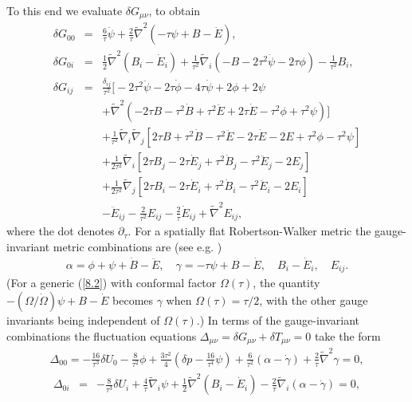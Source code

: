 To this end we evaluate $\delta G_{\mu\nu}$, to obtain 
%
\begin{eqnarray}
\delta G_{00}&=&\frac{6}{\tau}\dot{\psi}+\frac{2}{\tau}\tilde{\nabla}^2(-\tau \psi +B-\dot{E}),
\nonumber\\
\delta G_{0i}&=&\frac{1}{2}\tilde{\nabla}^2(B_i-\dot{E}_i)+\frac{1}{\tau^2}\tilde{\nabla}_i(-B-2\tau^2\dot{\psi}-2\tau \phi)-\frac{1}{\tau^2}B_i,
\nonumber\\
\delta G_{ij}&=&\frac{\delta_{ij}}{\tau^2}\bigg[-2\tau^2\ddot{\psi}-2\tau\dot{\phi}-4\tau\dot{\psi}+2\phi+2\psi
\nonumber\\
&&+\tilde{\nabla}^2\left(-2\tau B-\tau^2\dot{B}+\tau^2\ddot{E}+2\tau\dot{E}-\tau^2\phi+\tau^2\psi\right)\bigg]
\nonumber\\
&&+\frac{1}{\tau^2}\tilde{\nabla}_i\tilde{\nabla}_j\left[2\tau B +\tau^2\dot{B}-\tau^2\ddot{E}-2\tau\dot{E}-2E+\tau^2\phi-\tau^2\psi\right]
\nonumber\\
&&+\frac{1}{2\tau^2}\tilde{\nabla}_i\left[2\tau B_j-2\tau\dot{E}_j+\tau^2\dot{B}_j-\tau^2\ddot{E}_j-2E_j\right]
\nonumber\\
&&+\frac{1}{2\tau^2}\tilde{\nabla}_j\left[2\tau B_i-2\tau\dot{E}_i+\tau^2\dot{B}_i-\tau^2\ddot{E}_i-2E_i\right]
\nonumber\\
&&-\ddot{E}_{ij}-\frac{2}{\tau^2}E_{ij}-\frac{2}{\tau}\dot{E}_{ij}+\tilde{\nabla}^2E_{ij},
\label{8.6}
\end{eqnarray}
%
where the dot denotes $\partial_\tau$.
For a spatially flat Robertson-Walker  metric the gauge-invariant metric combinations are (see e.g. \cite{amarasinghe_2019})
%
\begin{eqnarray}
\alpha=\phi+\psi+\dot{B}-\ddot{E} ,\quad \gamma=-\tau\psi+B-\dot{E}, \quad B_i-\dot{E}_i,\quad E_{ij}.
\label{8.7}
\end{eqnarray}
%
(For a generic (\ref{8.2}) with conformal factor $\Omega(\tau)$, the quantity $-(\Omega/\dot{\Omega})\psi+B-\dot{E}$ becomes $\gamma$ when $\Omega(\tau)=\tau/2$, with the other gauge invariants being independent of $\Omega(\tau)$.)
In terms of the gauge-invariant combinations the fluctuation equations $\Delta_{\mu\nu}=\delta G_{\mu\nu}+\delta T_{\mu\nu}=0$ take the form
%
\begin{eqnarray}
\Delta_{00}=-\frac{16}{\tau^3}\delta U_{0}-\frac{8}{\tau^2}\phi+\frac{3\tau^2}{4}\left(\delta p -\frac{16}{\tau^4}\psi\right)
+\frac{6}{\tau^2}(\alpha-\dot{\gamma})+\frac{2}{\tau}\tilde{\nabla}^2\gamma=0,
\label{8.8}
\end{eqnarray}
%
\begin{eqnarray}
\Delta_{0i}&=&-\frac{8}{\tau^3}\delta U_{i}+\frac{4}{\tau}\tilde{\nabla}_i\psi
+\frac{1}{2}\tilde{\nabla}^2(B_i-\dot{E}_i)-\frac{2}{\tau}\tilde{\nabla}_i(\alpha-\dot{\gamma})=0,
\label{8.9}
\end{eqnarray}
